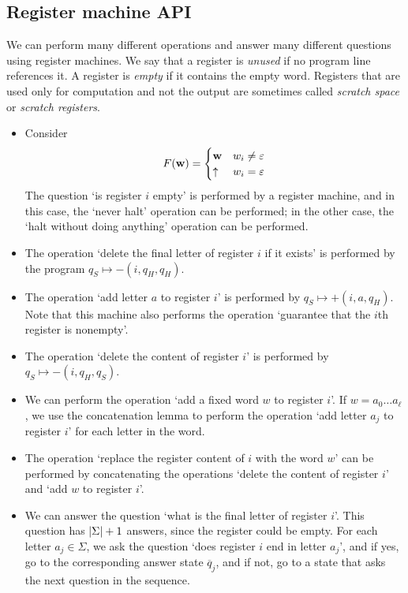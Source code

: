 \subsection{Register machine API}
We can perform many different operations and answer many different questions using register machines.
We say that a register is \emph{unused} if no program line references it.
A register is \emph{empty} if it contains the empty word.
Registers that are used only for computation and not the output are sometimes called \emph{scratch space} or \emph{scratch registers}.
\begin{itemize}
	\item Consider
	\[ F(\vb w) = \begin{cases}
		\vb w & w_i \neq \varepsilon \\
		\uparrow & w_i = \varepsilon
	\end{cases} \]
	The question `is register \( i \) empty' is performed by a register machine, and in this case, the `never halt' operation can be performed; in the other case, the `halt without doing anything' operation can be performed.
	\item The operation `delete the final letter of register \( i \) if it exists' is performed by the program \( q_S \mapsto -(i,q_H,q_H) \).
	\item The operation `add letter \( a \) to register \( i \)' is performed by \( q_S \mapsto +(i,a,q_H) \).
	Note that this machine also performs the operation `guarantee that the \( i \)th register is nonempty'.
	\item The operation `delete the content of register \( i \)' is performed by \( q_S \mapsto -(i,q_H,q_S) \).
	\item We can perform the operation `add a fixed word \( w \) to register \( i \)'.
	If \( w = a_0 \dots a_\ell \), we use the concatenation lemma to perform the operation `add letter \( a_j \) to register \( i \)' for each letter in the word.
	\item The operation `replace the register content of \( i \) with the word \( w \)' can be performed by concatenating the operations `delete the content of register \( i \)' and `add \( w \) to register \( i \)'.
	\item We can answer the question `what is the final letter of register \( i \)'.
	This question has \( \abs{\Sigma} + 1 \) answers, since the register could be empty.
	For each letter \( a_j \in \Sigma \), we ask the question `does register \( i \) end in letter \( a_j \)', and if yes, go to the corresponding answer state \( \overline q_j \), and if not, go to a state that asks the next question in the sequence.

\end{itemize}
